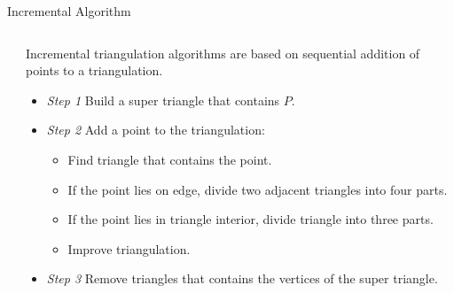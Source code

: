 \documentclass[10pt]{beamer}
\begin{document}
\begin{frame}{Incremental Algorithm}
\begin{columns}
		\begin{column}{0.4\textwidth} 
		\end{column}
		\begin{column}{0.6\textwidth}
			\alert{Incremental triangulation} algorithms are based on sequential addition of points 
			to a triangulation.  
			\begin{itemize}
				\item \textit{Step 1} Build a \alert{super triangle} that contains $P$.
				\item \textit{Step 2} Add a point to the triangulation:
					\begin{itemize}
						\item Find triangle that contains the point.
						\item If the point lies on edge, divide two adjacent triangles into four parts.
						\item If the point lies in triangle interior, divide triangle into three parts.
						\item Improve triangulation.
					\end{itemize}
				\item \textit{Step 3} Remove triangles that contains the vertices of the super triangle.
			\end{itemize}
		\end{column}
	\end{columns} 
\end{frame}
\end{document}
